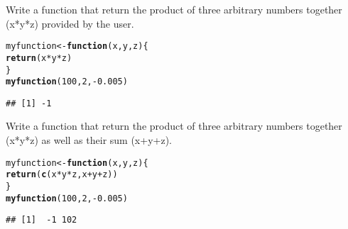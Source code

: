 \documentclass[12pt,a4paper]{scrartcl}\usepackage[]{graphicx}\usepackage[]{color}
\makeatletter
\newcommand{\hlnum}[1]{\textcolor[rgb]{0.686,0.059,0.569}{#1}}%
\newcommand{\hlopt}[1]{\textcolor[rgb]{0,0,0}{#1}}%
\newcommand{\hlstd}[1]{\textcolor[rgb]{0.345,0.345,0.345}{#1}}%
\newcommand{\hlkwa}[1]{\textcolor[rgb]{0.161,0.373,0.58}{\textbf{#1}}}%
\newcommand{\hlkwb}[1]{\textcolor[rgb]{0.69,0.353,0.396}{#1}}%
\newcommand{\hlkwc}[1]{\textcolor[rgb]{0.333,0.667,0.333}{#1}}%
\newcommand{\hlkwd}[1]{\textcolor[rgb]{0.737,0.353,0.396}{\textbf{#1}}}%
\newenvironment{kframe}{%
 \def\at@end@of@kframe{}%
 \ifinner\ifhmode%
  \def\at@end@of@kframe{\end{minipage}}%
  \begin{minipage}{\columnwidth}%
 \fi\fi%
 \def\FrameCommand##1{\hskip\@totalleftmargin \hskip-\fboxsep
 \colorbox{shadecolor}{##1}\hskip-\fboxsep
     \hskip-\linewidth \hskip-\@totalleftmargin \hskip\columnwidth}%
 \MakeFramed {\advance\hsize-\width
   \@totalleftmargin\z@ \linewidth\hsize
   \@setminipage}}%
 {\par\unskip\endMakeFramed%
 \at@end@of@kframe}
\newenvironment{knitrout}{}{} %
\makeatother
\begin{document}
\begin{Exercise}[difficulty=1, title={Build a first function}]
Write a function that return the product of three arbitrary numbers together (x*y*z) provided by the user.
\end{Exercise}
\begin{Answer}
\begin{knitrout}
\color{fgcolor}\begin{kframe}
\begin{alltt}
\hlstd{myfunction} \hlkwb{<-} \hlkwa{function}\hlstd{(}\hlkwc{x}\hlstd{,}\hlkwc{y}\hlstd{,}\hlkwc{z}\hlstd{)\{}
  \hlkwd{return}\hlstd{(x}\hlopt{*}\hlstd{y}\hlopt{*}\hlstd{z)}
\hlstd{\}}
\hlkwd{myfunction}\hlstd{(}\hlnum{100}\hlstd{,}\hlnum{2}\hlstd{,} \hlopt{-}\hlnum{0.005}\hlstd{)}
\end{alltt}
\begin{verbatim}
## [1] -1
\end{verbatim}
\end{kframe}
\end{knitrout}
\end{Answer}

\begin{Exercise}[difficulty=2, title={Multiple values in output}]
Write a function that return the product of three arbitrary numbers together (x*y*z) as well as their sum (x+y+z).
\end{Exercise}
\begin{Answer}
\begin{knitrout}
\color{fgcolor}\begin{kframe}
\begin{alltt}
\hlstd{myfunction} \hlkwb{<-} \hlkwa{function}\hlstd{(}\hlkwc{x}\hlstd{,}\hlkwc{y}\hlstd{,}\hlkwc{z}\hlstd{)\{}
  \hlkwd{return}\hlstd{(}\hlkwd{c}\hlstd{(x}\hlopt{*}\hlstd{y}\hlopt{*}\hlstd{z, x}\hlopt{+}\hlstd{y}\hlopt{+}\hlstd{z))}
\hlstd{\}}
\hlkwd{myfunction}\hlstd{(}\hlnum{100}\hlstd{,}\hlnum{2}\hlstd{,} \hlopt{-}\hlnum{0.005}\hlstd{)}
\end{alltt}
\begin{verbatim}
## [1]  -1 102
\end{verbatim}
\end{kframe}
\end{knitrout}
\end{Answer}

\clearpage
\end{document}
